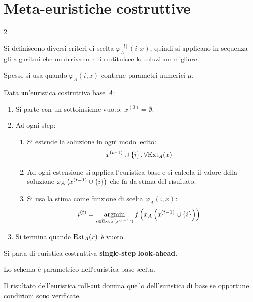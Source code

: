 \documentclass[\main/main.tex]{subfiles}
\begin{document}
\chapter{Meta-euristiche costruttive}
\begin{multicols}{2}
\begin{definition}
    Si definiscono diversi criteri di scelta \(\varphi_{A}^{[l]}(i, x)\), quindi si applicano in sequenza gli algoritmi che ne derivano e si restituisce la soluzione migliore.

    Spesso si usa quando \(\varphi_A(i, x)\) contiene parametri numerici \(\mu\).
\end{definition}
\begin{definition}
    Data un'euristica costruttiva base \(A\):
    \begin{enumerate}
        \item Si parte con un sottoinsieme vuoto: \(x^{(0)} = \emptyset\).
        \item Ad ogni step:
        \begin{enumerate}
            \item Si estende la soluzione in ogni modo lecito:
            \[
                x^{(t-1)} \cup \left\{i\right\}, \forall \text{Ext}_A(x)
            \]
            \item Ad ogni estensione si applica l'euristica base e si calcola il valore della soluzione \(x_A\left(x^{(t-1)} \cup \left\{i\right\}\right)\) che fa da stima del risultato.
            \item Si usa la stima come funzione di scelta \(\varphi_A(i, x)\):
            \[
                i^{(t)} = \operatorname*{argmin}_{i \in \text{Ext}_A(x^{(t-1)})} f\left(x_A\left(x^{(t-1)} \cup \left\{i\right\}\right)\right)
            \]
        \end{enumerate}
        \item Si termina quando \(\text{Ext}_A(x)\) è vuoto.
    \end{enumerate}
    
    Si parla di euristica costruttiva \textbf{single-step look-ahead}.
    
    Lo schema è parametrico nell'euristica base scelta.
\end{definition}
\begin{observation}
    Il risultato dell'euristica roll-out domina quello dell'euristica di base se opportune condizioni sono verificate.


\end{observation}
\end{multicols}
\end{document}
